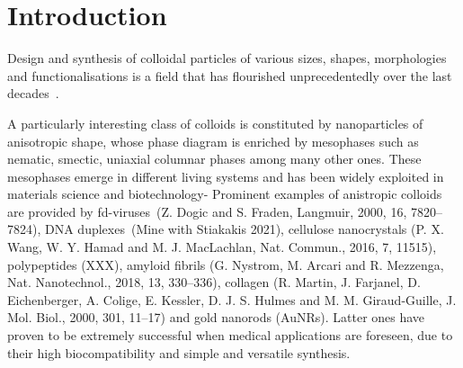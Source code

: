 \documentclass[journal=jacsat,manuscript=article]{achemso}
\begin{document}
\section{Introduction}



Design and synthesis of colloidal particles of various sizes, shapes, morphologies and functionalisations is a field that has flourished unprecedentedly over the last decades~\cite{Hueckel2021,Sacanna2013,Manoharan2015,Glotzer2007}. 


{\color{green}A particularly interesting class of colloids is constituted by nanoparticles of anisotropic shape, whose
  phase diagram is enriched by mesophases such as nematic, smectic, uniaxial columnar phases among many other ones.
  These mesophases emerge in different living systems and has been widely exploited in materials science and
  biotechnology-  Prominent examples of anistropic colloids are provided by fd-viruses~(Z. Dogic and S. Fraden,
  Langmuir, 2000, 16, 7820–7824), DNA duplexes~(Mine with Stiakakis 2021), cellulose nanocrystals (P. X. Wang, W. Y.
  Hamad and M. J. MacLachlan, Nat. Commun., 2016, 7, 11515), polypeptides (XXX), amyloid fibrils (G. Nystrom, M. Arcari
  and R. Mezzenga, Nat. Nanotechnol., 2018, 13, 330–336), collagen (R. Martin, J. Farjanel, D. Eichenberger, A.
Colige, E. Kessler, D. J. S. Hulmes and M. M. Giraud-Guille, J. Mol. Biol., 2000, 301, 11–17)} and gold nanorods
(AuNRs). Latter ones have proven to be extremely successful when
medical applications are foreseen, due to their high  biocompatibility and simple 
and versatile synthesis. 
\end{document}
